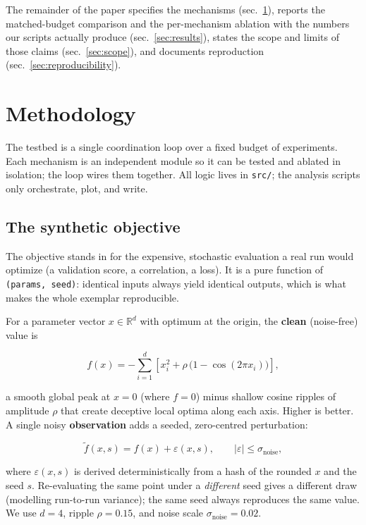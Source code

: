 \documentclass[
]{article}
\begin{document}
The remainder of the paper specifies the mechanisms
(sec.~\ref{sec:methodology}), reports the matched-budget comparison and
the per-mechanism ablation with the numbers our scripts actually produce
(sec.~\ref{sec:results}), states the scope and limits of those claims
(sec.~\ref{sec:scope}), and documents reproduction
(sec.~\ref{sec:reproducibility}).

\newpage

\section{Methodology}\label{sec:methodology}

The testbed is a single coordination loop over a fixed budget of
experiments. Each mechanism is an independent module so it can be tested
and ablated in isolation; the loop wires them together. All logic lives
in \texttt{src/}; the analysis scripts only orchestrate, plot, and
write.

\subsection{The synthetic objective}\label{the-synthetic-objective}

The objective stands in for the expensive, stochastic evaluation a real
run would optimize (a validation score, a correlation, a loss). It is a
pure function of \texttt{(params,\ seed)}: identical inputs always yield
identical outputs, which is what makes the whole exemplar reproducible.

For a parameter vector \(x \in \mathbb{R}^d\) with optimum at the
origin, the \textbf{clean} (noise-free) value is

\[
f(x) = -\sum_{i=1}^{d} \left[ x_i^2 + \rho\,\bigl(1 - \cos(2\pi x_i)\bigr) \right],
\]

a smooth global peak at \(x = 0\) (where \(f = 0\)) minus shallow cosine
ripples of amplitude \(\rho\) that create deceptive local optima along
each axis. Higher is better. A single noisy \textbf{observation} adds a
seeded, zero-centred perturbation:

\[
\tilde{f}(x, s) = f(x) + \varepsilon(x, s), \qquad |\varepsilon| \le \sigma_{\text{noise}},
\]

where \(\varepsilon(x, s)\) is derived deterministically from a hash of
the rounded \(x\) and the seed \(s\). Re-evaluating the same point under
a \emph{different} seed gives a different draw (modelling run-to-run
variance); the same seed always reproduces the same value. We use
\(d = 4\), ripple \(\rho = 0.15\), and noise scale
\(\sigma_{\text{noise}} = 0.02\).
\end{document}
